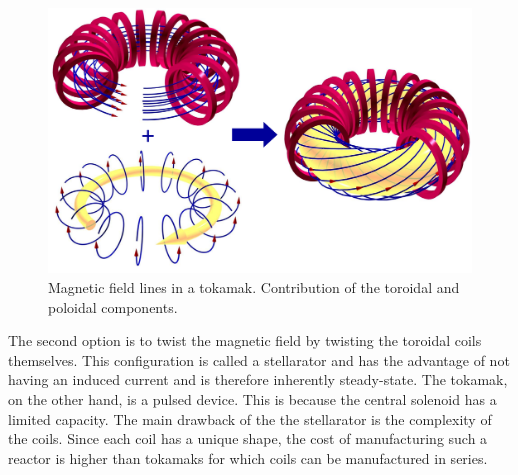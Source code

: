 \begin{figure}[h]
    \includegraphics[width=\linewidth]{Figures/Chapter1/tokamak_magnetic_fields.png}
    \caption{Magnetic field lines in a tokamak. Contribution of the toroidal and poloidal components.}
    \label{fig:tokamak magnetic field}
\end{figure}

The second option is to twist the magnetic field by twisting the toroidal coils themselves.
This configuration is called a \gls{stellarator} and has the advantage of not having an induced current and is therefore inherently steady-state.
The \gls{tokamak}, on the other hand, is a pulsed device.
This is because the central solenoid has a limited capacity.
The main drawback of the the \gls{stellarator} is the complexity of the coils.
Since each coil has a unique shape, the cost of manufacturing such a reactor is higher than \glspl{tokamak} for which coils can be manufactured in series.


